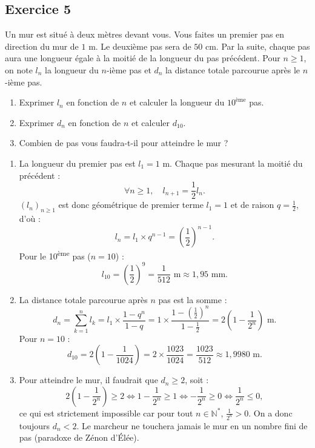 \documentclass[11pt,a4paper]{article}
\newcommand{\N}{\mathbb{N}}
\begin{document}
\subsection*{Exercice 5}
Un mur est situé à deux mètres devant vous. Vous faites un premier pas en direction du mur de $1\text{~m}$. Le deuxième pas sera de $50\text{~cm}$. Par la suite, chaque pas aura une longueur égale à la moitié de la longueur du pas précédent. Pour $n \ge 1$, on note $l_n$ la longueur du $n$-ième pas et $d_n$ la distance totale parcourue après le $n$-ième pas.
\begin{enumerate}
    \item Exprimer $l_n$ en fonction de $n$ et calculer la longueur du $10^{\text{ème}}$ pas.
    \item Exprimer $d_n$ en fonction de $n$ et calculer $d_{10}$.
    \item Combien de pas vous faudra-t-il pour atteindre le mur ?
\end{enumerate}

\begin{correctionbox}
\begin{enumerate}
    \item La longueur du premier pas est $l_1 = 1\text{~m}$. Chaque pas mesurant la moitié du précédent :
    \[
    \forall n \ge 1, \quad l_{n+1} = \frac{1}{2}l_n.
    \]
    $(l_n)_{n \ge 1}$ est donc géométrique de premier terme $l_1 = 1$ et de raison $q = \frac{1}{2}$, d'où :
    \[
    l_n = l_1 \times q^{n-1} = \left(\frac{1}{2}\right)^{n-1}.
    \]
    Pour le 10\textsuperscript{ème} pas ($n=10$) :
    \[
    l_{10} = \left(\frac{1}{2}\right)^9 = \frac{1}{512}\text{~m} \approx 1{,}95\text{~mm}.
    \]
    \item La distance totale parcourue après $n$ pas est la somme :
    \[
    d_n = \sum_{k=1}^n l_k = l_1 \times \frac{1 - q^n}{1 - q} = 1 \times \frac{1 - \left(\frac{1}{2}\right)^n}{1 - \frac{1}{2}} = 2\left(1 - \frac{1}{2^n}\right)\text{~m}.
    \]
    Pour $n = 10$ :
    \[
    d_{10} = 2\left(1 - \frac{1}{1024}\right) = 2 \times \frac{1023}{1024} = \frac{1023}{512} \approx 1{,}9980\text{~m}.
    \]
    \item Pour atteindre le mur, il faudrait que $d_n \ge 2$, soit :
    \[
    2\left(1 - \frac{1}{2^n}\right) \ge 2 \iff 1 - \frac{1}{2^n} \ge 1 \iff -\frac{1}{2^n} \ge 0 \iff \frac{1}{2^n} \le 0,
    \]
    ce qui est strictement impossible car pour tout $n \in \N^*$, $\frac{1}{2^n} > 0$. On a donc toujours $d_n < 2$. Le marcheur ne touchera jamais le mur en un nombre fini de pas (paradoxe de Zénon d'Élée).
\end{enumerate}
\end{correctionbox}
\end{document}
